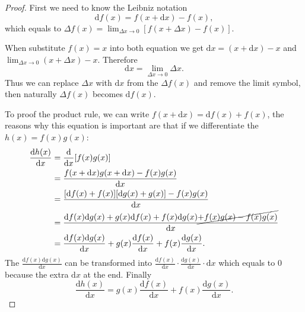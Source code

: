 \begin{proof}
    First we need to know the Leibniz notation
    \[
        \mathrm{d}f(x)=f(x+\mathrm{d}x)-f(x),
    \]
    which equals to \(\Delta f(x)=\lim_{\Delta x\to 0}[f(x+\Delta x)-f(x)]\).\par
    When substitute \(f(x)=x\) into both equation we get \(\mathrm{d}x=(x+\mathrm{d}x)-x\) and \(\lim_{\Delta x\to 0}(x+\Delta x)-x\). Therefore
    \[
        \mathrm{d}x=\lim_{\Delta x\to 0}\Delta x.
    \]
    Thus we can replace \(\Delta x\) with \(\mathrm{d}x\) from the \(\Delta f(x)\) and remove the limit symbol, then naturally \(\Delta f(x)\) becomes \(\mathrm{d}f(x)\).\par
    To proof the product rule, we can write \(f(x+\mathrm{d}x)=\mathrm{d}f(x)+f(x)\), the reasons why this equation is important are that if we differentiate the \(h(x)=f(x)g(x)\):
    \begin{align*}
        \frac{\mathrm{d}h(x)}{\mathrm{d}x} & =\frac{\mathrm{d}}{\mathrm{d}x}[f(x)g(x)]\\
                                           & =\frac{f(x+\mathrm{d}x)g(x+\mathrm{d}x)-f(x)g(x)}{\mathrm{d}x}\\
                                           & =\frac{[\mathrm{d}f(x)+f(x)][\mathrm{d}g(x)+g(x)]-f(x)g(x)}{\mathrm{d}x}\\
                                           & =\frac{\mathrm{d}f(x)\mathrm{d}g(x)+g(x)\mathrm{d}f(x)+f(x)\mathrm{d}g(x)\cancel{+f(x)g(x)-f(x)g(x)}}{\mathrm{d}x}\\
                                           & =\frac{\mathrm{d}f(x)\mathrm{d}g(x)}{\mathrm{d}x}+g(x)\frac{\mathrm{d}f(x)}{\mathrm{d}x}+f(x)\frac{\mathrm{d}g(x)}{\mathrm{d}x}.
    \end{align*}
    The \(\frac{\mathrm{d}f(x)\mathrm{d}g(x)}{\mathrm{d}x}\) can be transformed into \(\frac{\mathrm{d}f(x)}{\mathrm{d}x}\cdot\frac{\mathrm{d}g(x)}{\mathrm{d}x}\cdot\mathrm{d}x\) which equals to \(0\) because the extra \(\mathrm{d}x\) at the end. Finally
    \[
        \frac{\mathrm{d}h(x)}{\mathrm{d}x}=g(x)\frac{\mathrm{d}f(x)}{\mathrm{d}x}+f(x)\frac{\mathrm{d}g(x)}{\mathrm{d}x}.
    \]
\end{proof}


